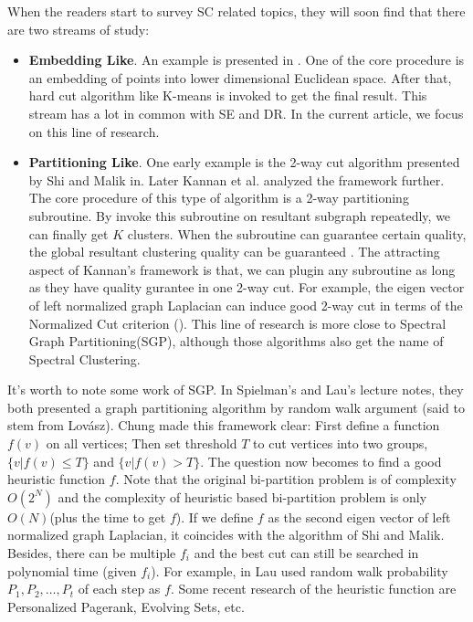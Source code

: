 When the readers start to survey SC related topics, they will soon find that
there are two streams of study:
\begin{itemize}
	\item \textbf{Embedding Like}. 
		An example is presented in 
		\ralg{\ref{alg:sc_sample}}. One of the core procedure is 
		an embedding of points into lower dimensional Euclidean space. 
		After that, hard cut algorithm like K-means is invoked to 
		get the final result. 		
		This stream has a lot in common with SE and
		DR. In the current article, we focus on this line of research. 
	\item \textbf{Partitioning Like}. 
		One early example is the 
		2-way cut algorithm presented by Shi and Malik in\cite{shi2000normalized}.
		Later Kannan et al. analyzed the framework further\cite{kannan2004clusterings}. 
		The core procedure of this type of algorithm is a 2-way 
		partitioning subroutine. By invoke this subroutine on 
		resultant subgraph repeatedly, we can finally get  $K$ clusters. 
		When the subroutine can guarantee certain quality, 
		the global resultant clustering quality can be guaranteed
		\cite{kannan2004clusterings}. The attracting aspect of Kannan's framework
		is that, we can plugin any subroutine as long as they have 
		quality gurantee in one 2-way cut. For example, the eigen vector of 
		left normalized graph Laplacian can induce good 2-way cut 
		in terms of the Normalized Cut criterion\cite{shi2000normalized}
		(\rsec{\ref{sec:ncut}}). This line of research is more close 
		to Spectral Graph Partitioning(SGP), although those algorithms also get the name 
		of Spectral Clustering. 
\end{itemize}

It's worth to note some work of SGP. In Spielman's\cite{spielman-2009spectral-ln} 
and Lau's\cite{lau-2012-spectral-ln} lecture notes, they both presented a 
graph partitioning algorithm by random walk argument
(said to stem from Lov{\'a}sz\cite{lovasz1990mixing}). 
Chung\cite{chung2007random} made this framework clear: First define a function 
$f(v)$ on all vertices; Then set threshold $T$ to cut vertices into two groups, 
$\{v|f(v) \le T\}$ and $\{v|f(v) > T\}$. The question now becomes to find a 
good heuristic function $f$. Note that the original bi-partition problem is of
complexity $O(2^N)$ and the complexity of heuristic based bi-partition problem is  
only $O(N)$(plus the time to get $f$). If we define $f$ as the second eigen vector 
of left normalized graph Laplacian, it coincides with the algorithm of Shi and
Malik\cite{shi2000normalized}. Besides, there can be multiple $f_i$ and 
the best cut can still be searched in polynomial time
(given $f_i$). For example, in 
\cite{lau-2012-spectral-ln} Lau used random walk probability 
$P_1, P_2, \ldots, P_t$ of each step as $f$. 
Some recent research of the heuristic function
are Personalized Pagerank\cite{andersen2007detecting}, 
Evolving Sets\cite{andersen2009finding}, etc. 

